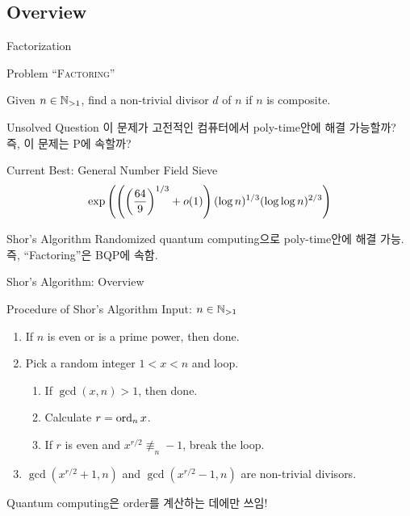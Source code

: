 \documentclass[../240513_msquare_shor.tex]{subfiles}
\begin{document}
\subsection{Overview}

\begin{frame}{Factorization}
    \begin{block}{Problem ``\textsc{Factoring}''}
        \centerline{Given \(n \in \mathbb{N}_{>1}\), find a non-trivial divisor \(d\) of \(n\) if \(n\) is composite.}
    \end{block}
    \pause
    \begin{alertblock}{Unsolved Question}
        이 문제가 고전적인 컴퓨터에서 poly-time안에 해결 가능할까?
        즉, 이 문제는 P에 속할까?
    \end{alertblock}
    \begin{exampleblock}{Current Best: General Number Field Sieve}
    \[\mathrm{exp}\left( \left(\left(\frac{64}{9}\right)^{1/3} + o(1)\right) (\log n)^{1/3} (\log \log n)^{2/3} \right)\]
    \end{exampleblock}
    \pause
    \begin{exampleblock}{Shor's Algorithm}
        Randomized quantum computing으로 poly-time안에 해결 가능.
        즉, ``Factoring''은 BQP에 속함.
    \end{exampleblock}
\end{frame}

\begin{frame}{Shor's Algorithm: Overview}
    \centerline{}
    \begin{block}{Procedure of Shor's Algorithm}
        Input: $n \in \mathbb{N}_{>1}$\small
        \begin{enumerate}
            \item If $n$ is even or is a prime power, then done.
            \item Pick a random integer $1 < x < n$ and loop.
            \begin{enumerate}
                \setlength\itemsep{0.4em}
                \item If $\gcd(x, n) > 1$, then done.
                \item Calculate $r = \operatorname{ord}_n x$. 
                \item If $r$ is even and $x^{r/2} \not\equiv_n -1$, break the loop.
            \end{enumerate}
            \item $\gcd(x^{r/2}+1, n)$ and $\gcd(x^{r/2}-1, n)$ are non-trivial divisors.
        \end{enumerate}
    \end{block}
    \begin{exampleblock}{}
        Quantum computing은 order를 계산하는 데에만 쓰임!
    \end{exampleblock}
\end{frame}
\end{document}
